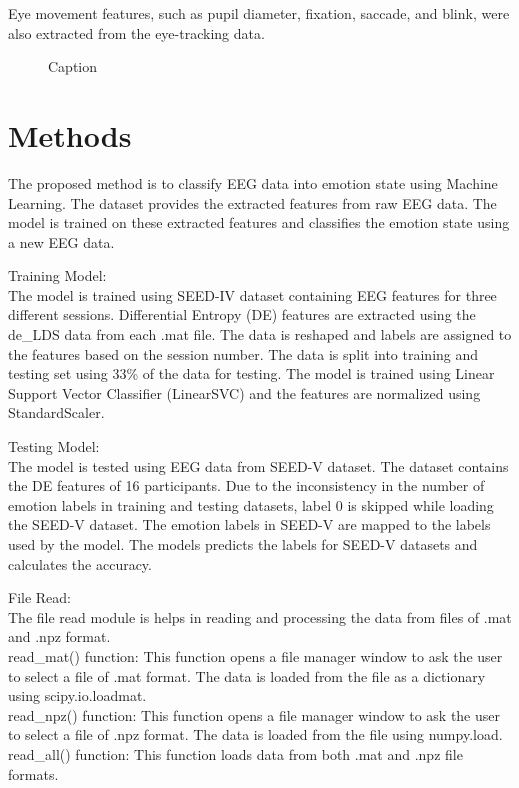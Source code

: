\documentclass[12pt, a4paper]{report}
\begin{document}
Eye movement features, such as pupil diameter, fixation, saccade, and blink, were also extracted from the eye-tracking data.


\begin{figure}[h]
    \centering
    \caption{Caption}
    \label{fig:mesh1}
\end{figure}

\section{Methods}
The proposed method is to classify EEG data into emotion state using Machine Learning. The dataset provides the extracted features from raw EEG data. The model is trained on these extracted features and classifies the emotion state using a new EEG data.

Training Model:
\\ The model is trained using SEED-IV dataset containing EEG features for three different sessions. Differential Entropy (DE) features are extracted using the de\_LDS data from each .mat file. The data is reshaped and labels are assigned to the features based on the session number. The data is split into training and testing set using 33\% of the data for testing. The model is trained using Linear Support Vector Classifier (LinearSVC) and the features are normalized using StandardScaler.

Testing Model:
\\ The model is tested using EEG data from SEED-V dataset. The dataset contains the DE features of 16 participants. Due to the inconsistency in the number of emotion labels in training and testing datasets, label 0 is skipped while loading the SEED-V dataset. The emotion labels in SEED-V are mapped to the labels used by the model. The models predicts the labels for SEED-V datasets and calculates the accuracy.

File Read:
\\ The file read module is helps in reading and processing the data from files of .mat and .npz format. 
\\ read\_mat() function: This function opens a file manager window to ask the user to select a file of .mat format. The data is loaded from the file as a dictionary using scipy.io.loadmat. 
\\ read\_npz() function: This function opens a file manager window to ask the user to select a file of .npz format. The data is loaded from the file using numpy.load.
\\ read\_all() function: This function loads data from both .mat and .npz file formats.
\end{document}
